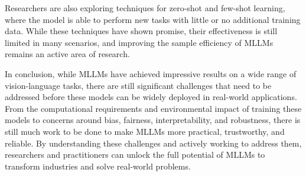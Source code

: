 Researchers are also exploring techniques for zero-shot and few-shot learning, where the model is able to perform new tasks with little or no additional training data. While these techniques have shown promise, their effectiveness is still limited in many scenarios, and improving the sample efficiency of MLLMs remains an active area of research.

In conclusion, while MLLMs have achieved impressive results on a wide range of vision-language tasks, there are still significant challenges that need to be addressed before these models can be widely deployed in real-world applications. From the computational requirements and environmental impact of training these models to concerns around bias, fairness, interpretability, and robustness, there is still much work to be done to make MLLMs more practical, trustworthy, and reliable. By understanding these challenges and actively working to address them, researchers and practitioners can unlock the full potential of MLLMs to transform industries and solve real-world problems.
